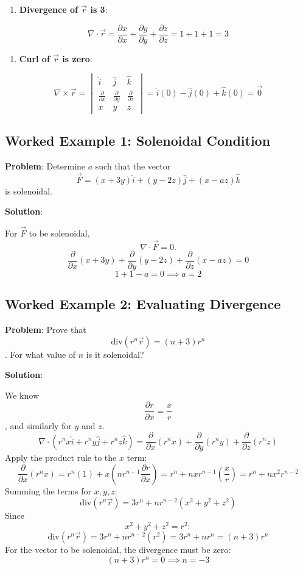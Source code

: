 \documentclass[
]{article}
\providecommand{\tightlist}{%
  \setlength{\itemsep}{0pt}\setlength{\parskip}{0pt}}
\begin{document}
\begin{enumerate}
\def\labelenumi{\arabic{enumi}.}
\tightlist
\item
  \textbf{Divergence of \(\vec{r}\) is 3}:
\end{enumerate}
\[
\nabla \cdot \vec{r} = \frac{\partial x}{\partial x} + \frac{\partial y}{\partial y} + \frac{\partial z}{\partial z} = 1 + 1 + 1 = 3
\]
\begin{enumerate}
\def\labelenumi{\arabic{enumi}.}
\setcounter{enumi}{1}
\tightlist
\item
  \textbf{Curl of \(\vec{r}\) is zero}:
\end{enumerate}
\[
\nabla \times \vec{r} =
\begin{vmatrix}
\hat{i} & \hat{j} & \hat{k} \\
\frac{\partial}{\partial x} & \frac{\partial}{\partial y} & \frac{\partial}{\partial z} \\
x & y & z
\end{vmatrix} = \hat{i}(0) - \hat{j}(0) + \hat{k}(0) = \vec{0}
\]

\subsection{Worked Example 1: Solenoidal
Condition}\label{worked-example-1-solenoidal-condition}

\textbf{Problem}: Determine \(a\) such that the vector
\[
\vec{F} = (x + 3y)\hat{i} + (y - 2z)\hat{j} + (x - az)\hat{k}
\]
is solenoidal.

\textbf{Solution}:

For \(\vec{F}\) to be solenoidal,
\[
\nabla \cdot \vec{F} = 0.
\]
\[
\frac{\partial}{\partial x}(x + 3y) + \frac{\partial}{\partial y}(y - 2z) + \frac{\partial}{\partial z}(x - az) = 0
\]
\[
1 + 1 - a = 0 \implies a = 2
\]

\subsection{Worked Example 2: Evaluating
Divergence}\label{worked-example-2-evaluating-divergence}

\textbf{Problem}: Prove that
\[
\text{div}(r^n \vec{r}) = (n + 3)r^n
\]
. For what value of \(n\) is it solenoidal?

\textbf{Solution}:

We know
\[
\frac{\partial r}{\partial x} = \frac{x}{r}
\]
, and similarly for \(y\) and \(z\).
\[
\nabla \cdot (r^n x\hat{i} + r^n y\hat{j} + r^n z\hat{k}) = \frac{\partial}{\partial x}(r^n x) + \frac{\partial}{\partial y}(r^n y) + \frac{\partial}{\partial z}(r^n z)
\]
Apply the product rule to the \(x\) term:
\[
\frac{\partial}{\partial x}(r^n x) = r^n(1) + x\left(nr^{n-1}\frac{\partial r}{\partial x}\right) = r^n + n x r^{n-1}\left(\frac{x}{r}\right) = r^n + n x^2 r^{n-2}
\]
Summing the terms for \(x, y, z\):
\[
\text{div}(r^n \vec{r}) = 3r^n + n r^{n-2}(x^2 + y^2 + z^2)
\]
Since
\[
x^2 + y^2 + z^2 = r^2:
\]
\[
\text{div}(r^n \vec{r}) = 3r^n + n r^{n-2}(r^2) = 3r^n + n r^n = (n + 3)r^n
\]
For the vector to be solenoidal, the divergence must be zero:
\[
(n + 3)r^n = 0 \implies n = -3
\]
\end{document}
